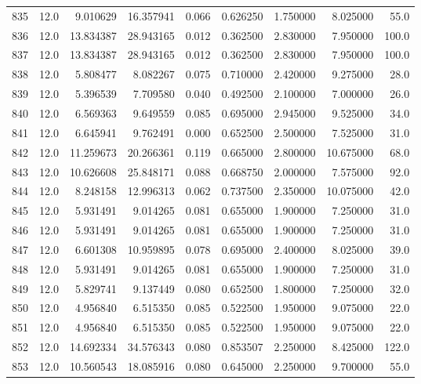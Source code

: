 \begin{tabular}{lrrrrrrrr}
835  &   12.0 &   9.010629 &  16.357941 &  0.066 &  0.626250 &  1.750000 &   8.025000 &   55.0 \\
836  &   12.0 &  13.834387 &  28.943165 &  0.012 &  0.362500 &  2.830000 &   7.950000 &  100.0 \\
837  &   12.0 &  13.834387 &  28.943165 &  0.012 &  0.362500 &  2.830000 &   7.950000 &  100.0 \\
838  &   12.0 &   5.808477 &   8.082267 &  0.075 &  0.710000 &  2.420000 &   9.275000 &   28.0 \\
839  &   12.0 &   5.396539 &   7.709580 &  0.040 &  0.492500 &  2.100000 &   7.000000 &   26.0 \\
840  &   12.0 &   6.569363 &   9.649559 &  0.085 &  0.695000 &  2.945000 &   9.525000 &   34.0 \\
841  &   12.0 &   6.645941 &   9.762491 &  0.000 &  0.652500 &  2.500000 &   7.525000 &   31.0 \\
842  &   12.0 &  11.259673 &  20.266361 &  0.119 &  0.665000 &  2.800000 &  10.675000 &   68.0 \\
843  &   12.0 &  10.626608 &  25.848171 &  0.088 &  0.668750 &  2.000000 &   7.575000 &   92.0 \\
844  &   12.0 &   8.248158 &  12.996313 &  0.062 &  0.737500 &  2.350000 &  10.075000 &   42.0 \\
845  &   12.0 &   5.931491 &   9.014265 &  0.081 &  0.655000 &  1.900000 &   7.250000 &   31.0 \\
846  &   12.0 &   5.931491 &   9.014265 &  0.081 &  0.655000 &  1.900000 &   7.250000 &   31.0 \\
847  &   12.0 &   6.601308 &  10.959895 &  0.078 &  0.695000 &  2.400000 &   8.025000 &   39.0 \\
848  &   12.0 &   5.931491 &   9.014265 &  0.081 &  0.655000 &  1.900000 &   7.250000 &   31.0 \\
849  &   12.0 &   5.829741 &   9.137449 &  0.080 &  0.652500 &  1.800000 &   7.250000 &   32.0 \\
850  &   12.0 &   4.956840 &   6.515350 &  0.085 &  0.522500 &  1.950000 &   9.075000 &   22.0 \\
851  &   12.0 &   4.956840 &   6.515350 &  0.085 &  0.522500 &  1.950000 &   9.075000 &   22.0 \\
852  &   12.0 &  14.692334 &  34.576343 &  0.080 &  0.853507 &  2.250000 &   8.425000 &  122.0 \\
853  &   12.0 &  10.560543 &  18.085916 &  0.080 &  0.645000 &  2.250000 &   9.700000 &   55.0 \\

\end{tabular}
